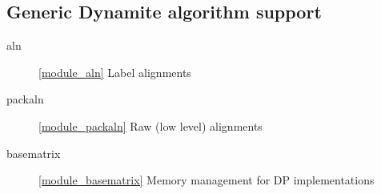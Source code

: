 \subsection{Generic Dynamite algorithm support}

\begin{description}
\item[aln] \ref{module_aln} Label alignments
\item[packaln] \ref{module_packaln} Raw (low level) alignments
\item[basematrix] \ref{module_basematrix} Memory management for DP implementations
\end{description}

